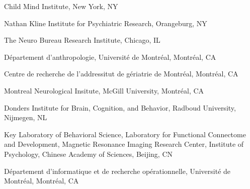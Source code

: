 \author{Cameron Craddock, Zarrar Shehzhad and Pierre Bellec}

\author[1,2,3]{R. Cameron Craddock}
\author[2,3]{Zarrar Shehzad}
\author[4,5]{Yassine BenHajali}
\author[5,6]{Francois Chouinard}
\author[6]{Alan Evans}
\author[6]{Buhachandra Khundrakpam}
\author[6]{John Lewis}
\author[1]{Qingyang Li}
\author[3,7]{Maarten Mennes}
\author[1,2]{Michael Milham}
\author[2,3]{Chao-gan Yan}
\author[8]{Xinian Zuo}
\author[3,5,9]{P. Bellec}


\address{1}{Child Mind Institute, New York, NY}
\address{2}{Nathan Kline Institute for Psychiatric Research, Orangeburg, NY}
\address{3}{The Neuro Bureau Research Institute, Chicago, IL}
\address{4}{D\'{e}partement d'anthropologie, Universit\'{e} de Montr\'{e}al, Montr\'{e}al, CA}
\address{5}{Centre de recherche de l'addressitut de g\'{e}riatrie de Montr\'{e}al, Montr\'{e}al, CA}
\address{6}{Montreal Neurological Insitute, McGill University, Montr\'{e}al, CA}
\address{7} {Donders Institute for Brain, Cognition, and Behavior, Radboud University, Nijmegen, NL}
\address{8}{Key Laboratory of Behavioral Science, Laboratory for Functional Connectome and Development, Magnetic Resonance Imaging Research Center, Institute of Psychology, Chinese Academy of Sciences, Beijing, CN}
\address{9}{D\'{e}partement d'informatique et de recherche op\'{e}rationnelle, 
        Universit\'{e} de Montr\'{e}al, Montr\'{e}al, CA}
